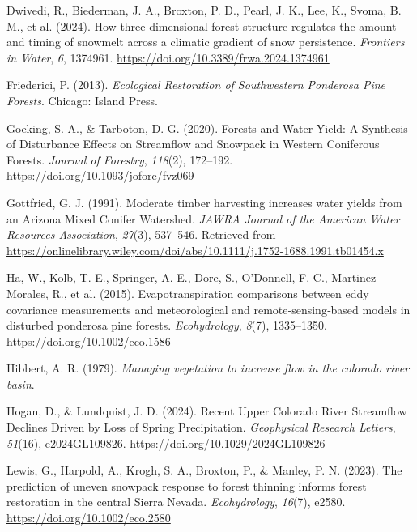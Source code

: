 \documentclass[
]{agujournal2019}
\newlength{\cslhangindent}
\newenvironment{CSLReferences}[2] %
 {\begin{list}{}{%
  \setlength{\itemindent}{0pt}
  \setlength{\leftmargin}{0pt}
  \setlength{\parsep}{0pt}
  \ifodd #1
   \setlength{\leftmargin}{\cslhangindent}
   \setlength{\itemindent}{-1\cslhangindent}
  \fi
  \setlength{\itemsep}{#2\baselineskip}}}
 {\end{list}}
\begin{document}
\begin{CSLReferences}{1}{0}
Dwivedi, R., Biederman, J. A., Broxton, P. D., Pearl, J. K., Lee, K.,
Svoma, B. M., et al. (2024). How three-dimensional forest structure
regulates the amount and timing of snowmelt across a climatic gradient
of snow persistence. \emph{Frontiers in Water}, \emph{6}, 1374961.
\url{https://doi.org/10.3389/frwa.2024.1374961}

Friederici, P. (2013). \emph{Ecological Restoration of Southwestern
Ponderosa Pine Forests}. Chicago: Island Press.

Goeking, S. A., \& Tarboton, D. G. (2020). Forests and {Water} {Yield}:
{A} {Synthesis} of {Disturbance} {Effects} on {Streamflow} and
{Snowpack} in {Western} {Coniferous} {Forests}. \emph{Journal of
Forestry}, \emph{118}(2), 172--192.
\url{https://doi.org/10.1093/jofore/fvz069}

Gottfried, G. J. (1991). Moderate timber harvesting increases water
yields from an {Arizona} {Mixed} {Conifer} {Watershed}. \emph{JAWRA
Journal of the American Water Resources Association}, \emph{27}(3),
537--546. Retrieved from
\url{https://onlinelibrary.wiley.com/doi/abs/10.1111/j.1752-1688.1991.tb01454.x}

Ha, W., Kolb, T. E., Springer, A. E., Dore, S., O'Donnell, F. C.,
Martinez Morales, R., et al. (2015). Evapotranspiration comparisons
between eddy covariance measurements and meteorological and
remote‐sensing‐based models in disturbed ponderosa pine forests.
\emph{Ecohydrology}, \emph{8}(7), 1335--1350.
\url{https://doi.org/10.1002/eco.1586}

Hibbert, A. R. (1979). \emph{Managing vegetation to increase flow in the
colorado river basin}.

Hogan, D., \& Lundquist, J. D. (2024). Recent {Upper} {Colorado} {River}
{Streamflow} {Declines} {Driven} by {Loss} of {Spring} {Precipitation}.
\emph{Geophysical Research Letters}, \emph{51}(16), e2024GL109826.
\url{https://doi.org/10.1029/2024GL109826}

Lewis, G., Harpold, A., Krogh, S. A., Broxton, P., \& Manley, P. N.
(2023). The prediction of uneven snowpack response to forest thinning
informs forest restoration in the central {Sierra} {Nevada}.
\emph{Ecohydrology}, \emph{16}(7), e2580.
\url{https://doi.org/10.1002/eco.2580}


\end{CSLReferences}
\end{document}
